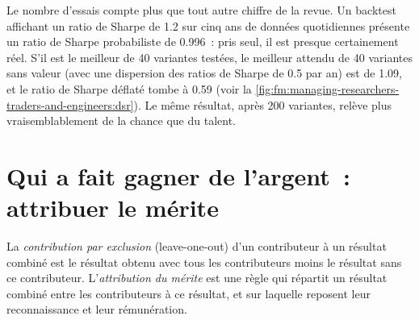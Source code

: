 Le nombre d'essais compte plus que tout autre chiffre de la revue. Un backtest affichant un ratio de Sharpe de 1.2 sur cinq ans de données quotidiennes présente un
ratio de Sharpe probabiliste de 0.996~: pris seul, il est presque certainement réel. S'il est le meilleur de 40 variantes testées, le meilleur attendu de 40
variantes sans valeur (avec une dispersion des ratios de Sharpe de 0.5 par an) est de 1.09, et le ratio de Sharpe déflaté tombe à 0.59
(voir la \cref{fig:fm:managing-researchers-traders-and-engineers:dsr}). Le même résultat, après 200 variantes, relève plus vraisemblablement de la chance que du talent.

\begin{omfigure}

\label{fig:fm:managing-researchers-traders-and-engineers:dsr}
\end{omfigure}

\section{Qui a fait gagner de l'argent~: attribuer le mérite}

\begin{definition}\label{def:fm:managing-researchers-traders-and-engineers:credit}
La \emph{contribution par exclusion} (leave-one-out) d'un contributeur à un résultat combiné est le résultat obtenu avec tous les contributeurs
moins le résultat sans ce contributeur. L'\emph{attribution du mérite} est une règle qui répartit un résultat combiné entre
les contributeurs à ce résultat, et sur laquelle reposent leur reconnaissance et leur rémunération.
\end{definition}

